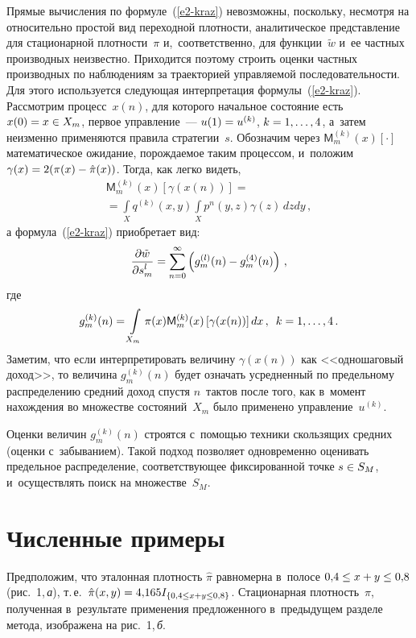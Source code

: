 \begin{multicols}{2}
  
  Прямые вычисления по формуле~(\ref{e2-kraz}) невозможны, поскольку, 
несмотря на относительно простой вид переходной плот\-ности, аналитическое 
пред\-став\-ле\-ние для стационарной плот\-ности~$\pi$ и,~соответственно, для 
функции~$\tilde{w}$ и~ее част\-ных производных неизвестно. Приходится 
поэтому строить оценки част\-ных производных по наблюдениям за 
траекторией управ\-ля\-емой по\-сле\-до\-ва\-тель\-ности. Для этого используется 
сле\-ду\-ющая интерпретация формулы~(\ref{e2-kraz}). Рас\-смот\-рим 
процесс~$x(n)$, для которого начальное со\-сто\-яние есть $x(0)\hm= x\hm\in 
X_m$, первое управ\-ле\-ние~--- $u(1)\hm= u^{(k)}$, $k\hm=1,\ldots , 4$, а~затем 
неизменно применяются правила стратегии~$s$. Обозначим через 
$\mathsf{M}_m^{(k)}(x)[\cdot ]$ математическое ожидание, по\-рож\-да\-емое 
таким процессом, и~положим $\gamma(x)\hm=2(\pi (x)\hm- \hat{\pi}(x))$. 
Тогда, как легко видеть,
  \begin{multline}
  \mathsf{M}_m^{(k)}(x) [\gamma(x(n))] ={}\\
  {}=\int\limits_X q^{(k)} (x,y) 
\int\limits_X p^n(y,z) \gamma(z)\,dzdy\,,
  \label{e3-kraz}
  \end{multline}
а формула~(\ref{e2-kraz}) приобретает вид:
$$
\displaystyle\frac{\displaystyle \partial\tilde{w}\mathstrut}{\displaystyle \partial s_m^l\mathstrut} =\sum\limits^\infty_{n=0} \left( 
g_m^{(l)}(n)- g_m^{(4)}(n)\right)\,,
$$
где 
$$
g_m^{(k)}(n)= \int\limits_{X_m} \pi(x) \mathsf{M}_m^{(k)} (x) \left[ 
\gamma(x(n))\right] dx\,,\enskip k=1,\ldots , 4\,.
$$
 Заметим, что если интерпретировать величину $\gamma(x(n))$ как 
<<одношаговый доход>>, то величина $g_m^{(k)}(n)$ будет означать 
усредненный по предельному распределению средний доход 
спустя $n$~\mbox{так\-тов} после того, как в~момент на\-хож\-де\-ния во множестве 
со\-сто\-яний~$X_m$ было применено управ\-ле\-ние~$u^{(k)}$.
{

} 


  Оценки величин $g_m^{(k)}(n)$ строятся с~помощью техники скользящих 
средних (оцен\-ки с~забыванием). Такой подход позволяет одновременно 
оценивать предельное распределение, со\-от\-вет\-ст\-ву\-ющее фиксированной 
точ\-ке $s\hm\in S_M$, и~осуществлять поиск на множестве~$S_M$. 
  
  \section{Численные примеры}
  
  \vspace*{-6pt}
  
  Предположим, что эталонная плотность $\hat{\pi}$ равномерна в~полосе 
$0{,}4\hm\leq x\hm+y \hm\leq 0{,}8$ (рис.~1,\,\textit{а}), т.\,е.\ 
$\hat{\pi}(x,y)\hm= 4{,}165 I_{\{ 0{,}4\leq x+y\leq 0{,}8\}}$. Стационарная 
плот\-ность~$\pi$, полученная в~результате применения предложенного 
в~предыду\-щем разделе метода, изоб\-ра\-же\-на на рис.~1,\,\textit{б}. 




\end{multicols}
